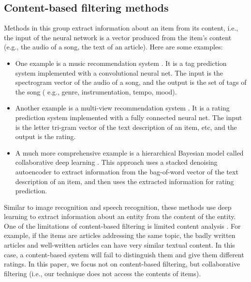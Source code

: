 \documentclass[letterpaper]{article}
\begin{document}
\subsection{Content-based filtering methods}
Methods in this group extract information about an item from its content, 
i.e., the input of the neural network is a vector produced from the item's 
content (e.g., the audio of a song, the text of an article). Here are some 
examples:
\begin{itemize}
	\item One example is a music recommendation system 	\cite{van2013deep}. 
	It is a tag prediction system implemented with a convolutional neural net. 
	The input is the spectrogram vector of the audio of a song,
	and the output 	is the set of tags of the song (
	e.g., genre, instrumentation, tempo, mood).
	\item Another example is a multi-view recommendation system 	
	\cite{elkahky2015multi}. 
	It is a rating prediction system implemented with a fully connected 
	neural net.
	The input is the letter tri-gram vector of the text description of an item, 
	etc, and the output is the rating.
	\item A much more comprehensive example is a hierarchical Bayesian model 
	called collaborative deep learning \cite{wang2015collaborative}.
	This approach uses a stacked denoising autoencoder to extract information 
	from the bag-of-word vector of the text description of an item,
	and then uses the extracted information for rating prediction.
\end{itemize}
Similar to image recognition and speech recognition, these methods use deep 
learning to extract information about an entity from the content of the entity.
One of the limitations of content-based filtering is limited content analysis 
\cite{adomavicius2005toward}.
For example, if the items are articles addressing the same topic,
the badly written articles and well-written articles can have very similar 
textual content. In this case, a content-based system will fail to distinguish 
them and give them different ratings.
In this paper, we focus not on content-based filtering, but collaborative 
filtering (i.e., our technique does not access the contents of items).
\end{document}
